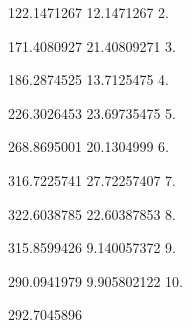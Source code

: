 122.1471267          12.1471267 
2.  
    
 171.4080927         21.40809271 
3.  
    
 186.2874525         13.7125475 
4.  
    
 226.3026453         23.69735475 
5.  
    
 268.8695001         20.1304999 
6.  
    
 316.7225741         27.72257407 
7.  
    
 322.6038785         22.60387853 
8.  
    
 315.8599426         9.140057372 
9.  
    
 290.0941979         9.905802122 
10.     
    
 292.7045896 